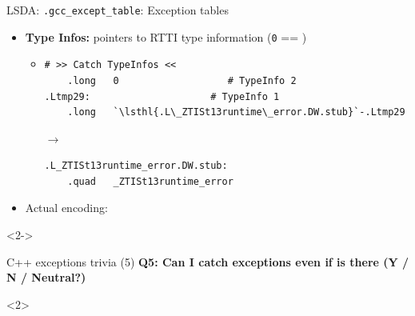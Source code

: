 \begin{frame}[fragile]{LSDA: \texttt{.gcc\_except\_table}: Exception tables}
  \begin{center}
    \resizebox{0.65\textwidth}{!}{}
  \end{center}
  \vfill
  \begin{itemize}
  \item \textbf{Type Infos:} pointers to RTTI type information (\texttt{0} == )
    \begin{itemize}
    \item %
      \begin{minipage}{0.4\textwidth}
        \begin{lstlisting}[style=asm,basicstyle={\ttfamily\tiny}]
                             # >> Catch TypeInfos <<
	.long	0                   # TypeInfo 2
.Ltmp29:                     # TypeInfo 1
	.long	`\lsthl{.L\_ZTISt13runtime\_error.DW.stub}`-.Ltmp29
        \end{lstlisting}
      \end{minipage}
      $\rightarrow$%
      \begin{minipage}{0.4\textwidth}
        \begin{lstlisting}[style=asm,basicstyle={\ttfamily\tiny}]
.L_ZTISt13runtime_error.DW.stub:
	.quad	_ZTISt13runtime_error
        \end{lstlisting}
      \end{minipage}
    \end{itemize}
    \medskip

  \item Actual encoding: 
  \end{itemize}

  \begin{onlyenv}<2->
    \overlayLayer{
      \\[0.5in] 
      \vspace{0.5in}
    }
  \end{onlyenv}
\end{frame}

\begin{frame}[fragile]{C++ exceptions trivia (5)}
  \textbf{Q5: Can I catch exceptions even if  is there (Y / N / Neutral?)}

  \begin{onlyenv}<2>
  \end{onlyenv}
\end{frame}
